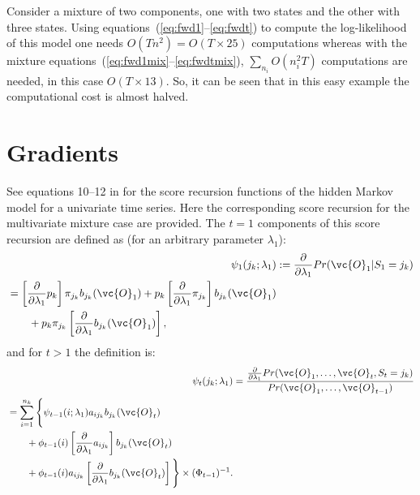Consider a mixture of two components, one with two states
and the other with three states.  Using
equations~(\ref{eq:fwd1}--\ref{eq:fwdt}) to compute the log-likelihood
of this model one needs $O(Tn^{2})=O(T\times 25)$ computations whereas
with the mixture equations~(\ref{eq:fwd1mix}--\ref{eq:fwdtmix}),
$\sum_{n_{i}} O(n_{i}^{2}T)$ computations are needed, in this case
$O(T \times 13)$.  So, it can be seen that in this easy example the
computational cost is almost halved.

\section{Gradients}

\newcommand{\fpp}{\frac{\partial} {\partial \lambda_{1}}}

See equations 10--12  in \cite{Lystig2002} for the score recursion 
functions of the hidden Markov model for a univariate time series. 
Here the corresponding score recursion for the multivariate mixture 
case are provided. The $t=1$ components of this score recursion are 
defined as (for an arbitrary parameter $\lambda_{1}$):
\begin{align}
\psi_{1}(j_{k};\lambda_{1}) &:=  \fpp Pr(\vc{O}_{1}|S_{1}=j_{k}) \\
\begin{split} 
	&= \left[  \fpp p_{k} \right] \pi_{j_{k}}b_{j_{k}}(\vc{O}_{1}) + 
	p_{k}\left[ \fpp \pi_{j_{k}} \right] b_{j_{k}}(\vc{O}_{1}) \\
	& \qquad  + p_{k}\pi_{j_{k}} \left[ \fpp 
b_{j_{k}}(\vc{O}_{1})\right],
\end{split} \label{eq:psi1}
\end{align}
and for $t>1$ the definition is:
\begin{align}
\psi_{t}(j_{k};\lambda_{1})  & =  \frac{\fpp Pr(\vc{O}_{1}, \ldots, 
\vc{O}_{t}, S_{t}=j_{k})}
			{Pr(\vc{O}_{1}, \ldots, \vc{O}_{t-1})}  \\
\begin{split} 
	& =  
			 \sum_{i=1}^{n_{k}} \Bigg\{ \psi_{t-1}(i;\lambda_{1})a_{ij_{k}} 
			 b_{j_{k}}(\vc{O}_{t}) \\ 
			 &\qquad +\phi_{t-1}(i) \left[ \fpp a_{ij_{k}} \right] b_{j_{k}} 
(\vc{O}_{t}) \\
			&\qquad +\phi_{t-1}(i)a_{ij_{k}}  \left[ \fpp b_{j_{k}} 
(\vc{O}_{t}) \right] \Bigg\} 
			\times (\Phi_{t-1})^{-1}.
\end{split} \label{eq:psit}
\end{align}


